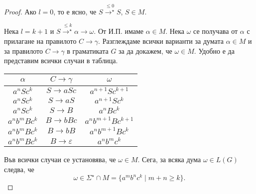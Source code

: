 \begin{proof}
  Ако $l = 0$, то е ясно, че $S \stackrel{\leq 0}{\rightarrow^\star} S$, $S \in M$.

  Нека $l = k+1$ и $S \stackrel{\leq k}{\rightarrow^\star} \alpha \rightarrow \omega$.
  От И.П. имаме $\alpha \in M$. Нека $\omega$ се получава от $\alpha$ с прилагане на правилото $C \rightarrow \gamma$.
  Разглеждаме всички варианти за думата $\alpha \in M$ и за правилото $C\rightarrow \gamma$ в граматиката $G$
  за да докажем, че  $\omega \in M$.
  Удобно е да представим всички случаи в таблица.
  \begin{center}
    \begin{tabular}{| c | c | c |}
      \hline
      $\alpha$ & $C \rightarrow \gamma$ & $\omega$ \\ \hline
      $a^nSc^k$ & $S \rightarrow aSc$ & $a^{n+1}Sc^{k+1}$ \\ \hline
      $a^nSc^k$ & $S \rightarrow aS$ & $a^{n+1}Sc^{k}$ \\ \hline
      $a^nSc^k$ & $S \rightarrow B$ & $a^{n}Bc^{k}$ \\ \hline
      $a^nb^mBc^k$ & $B \rightarrow bBc$ & $a^nb^{m+1}Bc^{k+1}$\\ \hline
      $a^nb^mBc^k$ & $B \rightarrow bB$ & $a^nb^{m+1}Bc^{k}$\\ \hline
      $a^nb^mBc^k$ & $B \rightarrow \varepsilon$ & $a^nb^{m}c^{k}$\\ \hline
    \end{tabular}
  \end{center}
  Във всички случаи се установява, че $\omega \in M$.
  Сега, за всяка дума $\omega \in L(G)$ следва, че
  \[\omega \in \Sigma^\star \cap M = \{a^mb^nc^k\mid m+n \geq k\}.\]
\end{proof}

